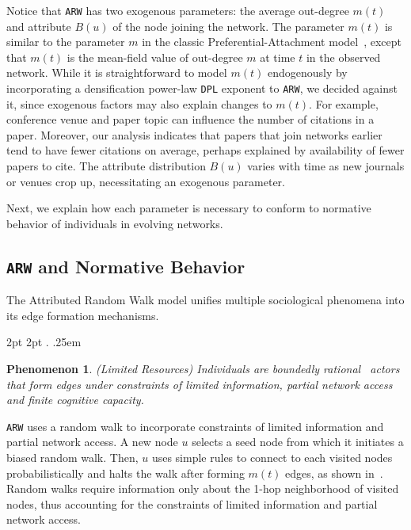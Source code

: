 Notice that \texttt{ARW} has two exogenous parameters: the average out-degree
$m(t)$ and attribute $B(u)$ of the node joining the network. The parameter
$m(t)$ is similar to the parameter $m$ in the classic Preferential-Attachment
model~\cite{barabasi1999emergence}, except that $m(t)$ is the mean-field value
of out-degree $m$ at time $t$ in the observed network. While it is straightforward to model $m(t)$
endogenously by incorporating a densification power-law \texttt{DPL} exponent
to \texttt{ARW}, we decided against it, since exogenous factors may
also explain changes to $m(t)$. For example, conference venue and paper topic can
influence the number of citations in a paper. Moreover, our analysis indicates
that papers that join networks earlier tend to have fewer citations on average,
perhaps explained by availability of {fewer} papers to cite. The attribute distribution
$B(u)$ varies with time as new journals or venues crop up, necessitating an exogenous
parameter.

Next, we explain how each parameter is necessary to conform to normative
behavior of individuals in evolving networks.

\subsection{\texttt{ARW} and Normative Behavior}
\label{sub:Model Interpretation}

The Attributed Random Walk model unifies multiple sociological phenomena
into its edge formation mechanisms.

  {2pt} %
  {2pt} %
  {\itshape} %
  {} %
  {\bfseries} %
  {.} %
  {.25em} %
  {} %

\theoremstyle{exampstyle} \newtheorem{ph}{Phenomenon}

\begin{ph}
	(Limited Resources) Individuals are boundedly rational~\cite{simon1972theories,gigerenzer1996reasoning,lipman1995information}
	actors that form edges under constraints of limited information, partial network access and finite cognitive capacity.
\end{ph}
\texttt{ARW} uses a random walk to incorporate constraints of limited information
and partial network access. A new node $u$ selects a seed node from which it
initiates a biased random walk. Then, $u$ uses simple rules to connect to each visited
nodes probabilistically and halts the walk after forming $m(t)$ edges, as shown in~. Random walks require information only about the
1-hop neighborhood of visited nodes, thus accounting for  the constraints of limited information and partial network access.


